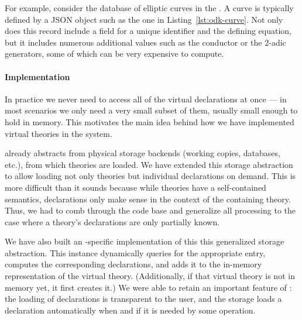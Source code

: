 

For example, consider the database of elliptic curves in the \LMFDB.
A curve is typically defined by a JSON object such as the one in Listing~\ref{lst:odk-curve}.
Not only does this record include a field  for a unique identifier and the defining equation, but it includes numerous additional values such as the conductor or the $2$-adic generators, some of which can be very expensive to compute.

\paragraph{Implementation}
In practice we never need to access all of the virtual declarations at once --- in most
scenarios we only need a very small subset of them, usually small enough to hold in memory.
This motivates the main idea behind how we have implemented virtual theories in the \MMT system.

\MMT already abstracts from physical storage backends (working copies, databases, etc.), from which theories are loaded.
We have extended this storage abstraction to allow loading not only theories but individual declarations on demand.
This is more difficult than it sounds because while theories have a self-contained semantics, declarations only make sense in the context of the containing theory.
Thus, we had to comb through the \MMT code base and generalize all processing to the case where a theory's declarations are only partially known.

We have also built an \LMFDB-specific implementation of this this generalized storage abstraction.
This instance dynamically queries \LMFDB for the appropriate entry, computes the corresponding declarations, and adds it to the in-memory representation of the virtual theory.
(Additionally, if that virtual theory is not in memory yet, it first creates it.)
We were able to retain an important feature of \MMT: the loading of declarations is transparent to the user, and the storage loads a declaration automatically when and if it is needed by some operation.


